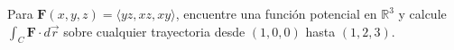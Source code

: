Para $\mathbf{F}(x,y,z)=\langle yz,xz,xy\rangle$, encuentre una función potencial en $\mathbb R^3$ y calcule $\int_C\mathbf{F}\cdot d\vec r$ sobre cualquier trayectoria desde $(1,0,0)$ hasta $(1,2,3)$.
